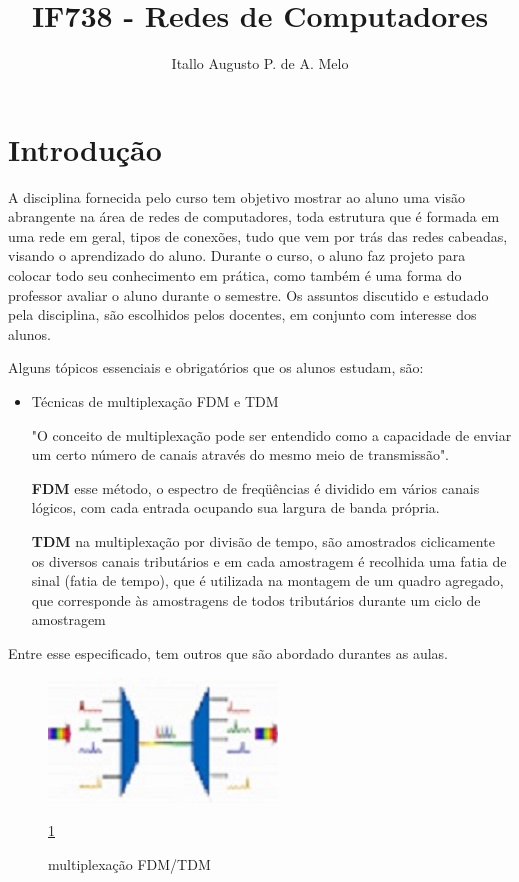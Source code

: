 \documentclass[10pt]{article}
\title{IF738 - Redes de Computadores}
\author{Itallo Augusto P. de A. Melo }
\date{\vspace{-5ex}}
\begin{document}
\maketitle

\section{Introdução}
\label{intro}
\label{um}

 A disciplina fornecida pelo curso tem objetivo mostrar ao aluno uma visão abrangente na área de redes de computadores, toda estrutura que é formada em uma rede em geral, tipos de conexões, tudo que vem por trás das redes cabeadas, visando o aprendizado do aluno. Durante o curso, o aluno faz projeto para colocar todo seu conhecimento em prática, como também é uma forma do professor avaliar o aluno durante o semestre. Os assuntos discutido e estudado pela disciplina, são escolhidos pelos docentes, em conjunto com interesse dos alunos.\cite{intro}

Alguns tópicos essenciais e obrigatórios que os alunos estudam, são:\cite{um}

\begin{itemize}
    \item Técnicas de multiplexação FDM e TDM
    
   "O conceito de multiplexação pode ser entendido como a capacidade de enviar um certo número de canais através do mesmo meio de transmissão".
    
    \textbf{FDM} esse método, o espectro de freqüências é dividido em vários canais lógicos, com cada entrada ocupando sua largura de banda própria.
    
    \textbf{TDM} na multiplexação por divisão de tempo, são amostrados ciclicamente os diversos canais tributários e em cada amostragem é recolhida uma fatia de sinal (fatia de tempo), que é utilizada na montagem de um quadro agregado, que corresponde às amostragens de todos tributários durante um ciclo de amostragem 
    
\end{itemize}
 
Entre esse especificado, tem outros que são abordado durantes as aulas.

\begin{figure}[h!]
    \centering
    \includegraphics[scale=1.2]{iapam.jpg}
    \caption{multiplexação FDM/TDM}
    \label{fig:imagem}
     \ref{fig:imagem} 
\end{figure}
\end{document}

